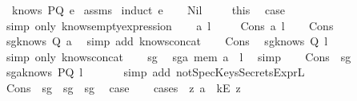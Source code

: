 \begin{isabellebody}
\ \ {\isachardoublequoteopen}knows\ PQ\ e{\isachardoublequoteclose}\isanewline
%
\isadelimproof
%
\endisadelimproof
%
\isatagproof
{}\isamarkupfalse%
\ assms\isanewline
{}\isamarkupfalse%
\ {\isacharparenleft}induct\ e{\isacharparenright}\isanewline
\ \ \isamarkupfalse%
\ Nil\ \isanewline
\ \ \isamarkupfalse%
\ this\ \isamarkupfalse%
\ {\isacharquery}case\ \isamarkupfalse%
\ {\isacharparenleft}simp\ only{\isacharcolon}\ knows{\isacharunderscore}emptyexpression{\isacharparenright}\isanewline
{}\isamarkupfalse%
\isanewline
\ \ \isamarkupfalse%
\ a\ l\ \isanewline
\ \ \isamarkupfalse%
\ {\isacharparenleft}Cons\ a\ l{\isacharparenright}\isanewline
\ \ \isamarkupfalse%
\ Cons\ \isamarkupfalse%
\ sg{}{\isacharcolon}{\isachardoublequoteopen}knows\ Q\ {\isacharbrackleft}a{\isacharbrackright}{\isachardoublequoteclose}\ \isamarkupfalse%
\ {\isacharparenleft}simp\ add{\isacharcolon}\ knows{\isacharunderscore}concat{\isacharunderscore}{}{\isacharparenright}\isanewline
\ \ \isamarkupfalse%
\ Cons\ \isamarkupfalse%
\ sg{}{\isacharcolon}{\isachardoublequoteopen}knows\ Q\ l{\isachardoublequoteclose}\ \isamarkupfalse%
\ {\isacharparenleft}simp\ only{\isacharcolon}\ knows{\isacharunderscore}concat{\isacharunderscore}{}{\isacharparenright}\isanewline
\ \ \isamarkupfalse%
\ sg{}\ \isamarkupfalse%
\ sg{}{\isacharcolon}{\isachardoublequoteopen}a\ mem\ {\isacharparenleft}a\ {\isacharhash}\ l{\isacharparenright}{\isachardoublequoteclose}\ \isamarkupfalse%
\ simp\isanewline
\ \ \isamarkupfalse%
\ Cons\ \ sg{}\ \isamarkupfalse%
\ sg{}a{\isacharcolon}{\isachardoublequoteopen}knows\ PQ\ l{\isachardoublequoteclose}\ \isanewline
\ \ \ \ \isamarkupfalse%
\ {\isacharparenleft}simp\ add{\isacharcolon}\ notSpecKeysSecretsExpr{\isacharunderscore}L{}{\isacharparenright}\isanewline
\ \ \isamarkupfalse%
\ Cons\ \ sg{}\ \ sg{}\ \ sg{}\ \isamarkupfalse%
\ {\isacharquery}case\isanewline
\ \ \isamarkupfalse%
\ {\isacharparenleft}cases\ {\isachardoublequoteopen}{\isasymexists}\ z{}{\isachardot}\ a\ {\isacharequal}\ kE\ z{}{\isachardoublequoteclose}{\isacharparenright}\isanewline

\end{isabellebody}
